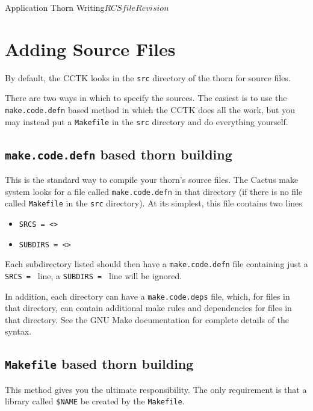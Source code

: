 \begin{cactuspart}{Application Thorn Writing}{$RCSfile$}{$Revision$}
\section{Adding Source Files}

By default, the CCTK looks in the \texttt{src} directory of the thorn for source
files.

There are two ways in which to specify the sources.  The easiest is to use the
\texttt{make.code.defn} based method in which the CCTK does all the work, but you
may instead put a \texttt{Makefile} in the \texttt{src} directory and do everything
yourself.

\subsection{\texttt{make.code.defn} based thorn building}
\label{sec:mabathbu}

This is the standard way to compile your thorn's source files.
The Cactus make system looks for a file called \texttt{make.code.defn} in that
directory (if there is no file called \texttt{Makefile} in the \texttt{src} directory).  At its simplest, this file contains two lines

\begin{itemize}
\item \texttt{SRCS = <>}

\item \texttt{SUBDIRS = <>}

\end{itemize}

Each subdirectory listed should then have a \texttt{make.code.defn} file
containing just a \texttt{SRCS = } line, a \texttt{SUBDIRS = } line will
be ignored.

In addition, each directory can have a \texttt{make.code.deps} file, which,
for files in that directory, can contain additional make rules and dependencies
for files in that directory.  See the GNU Make documentation for complete details of the
syntax.

\subsection{\texttt{Makefile} based thorn building}

This method gives you the ultimate responsibility.
The only requirement is that
a library called \texttt{\$NAME} be created by the \texttt{Makefile}.


\end{cactuspart}
